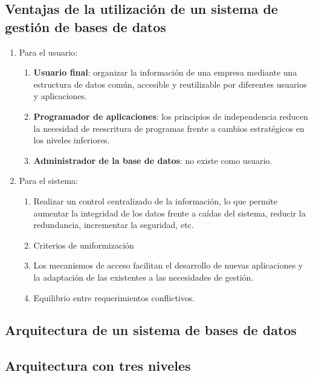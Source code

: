 \documentclass[10pt,a4paper,spanish]{report}
\begin{document}
\textcolor[rgb]{1,0.2,0.3}{\section{Ventajas de la utilización de un sistema de gestión de bases de datos}}
\begin{enumerate}[$\heartsuit$]
    \item Para el usuario:
    \begin{enumerate}[$\longrightarrow$]
        \item \textbf{\textcolor[rgb]{1,0.2,0.3}{Usuario final}}: organizar la información de una empresa mediante una estructura de datos común, accesible y reutilizable por diferentes usuarios y aplicaciones.
        \item \textbf{\textcolor[rgb]{1,0.2,0.3}{Programador de aplicaciones}}: los principios de independencia reducen la necesidad de reescritura de programas frente a cambios estratégicos en los niveles inferiores.
        \item \textcolor[rgb]{1,0.2,0.3}{\textbf{Administrador de la base de datos}}: no existe como usuario.
    \end{enumerate}
    \item Para el sistema:
    \begin{enumerate}[$\longrightarrow$]
        \item Realizar un control centralizado de la información, lo que permite aumentar la integridad de los datos frente a caídas del sistema, reducir la redundancia, incrementar la seguridad, etc.
        \item Criterios de uniformización
        \item Los mecanismos de acceso facilitan el desarrollo de nuevas aplicaciones y la adaptación de las existentes a las necesidades de gestión.
        \item Equilibrio entre requerimientos conflictivos.
    \end{enumerate}
\end{enumerate}

\textcolor[rgb]{1,0.2,0.3}{\chapter{Arquitectura de un sistema de bases de datos}}
\textcolor[rgb]{1,0.2,0.3}{\section{Arquitectura con tres niveles}}
\end{document}
